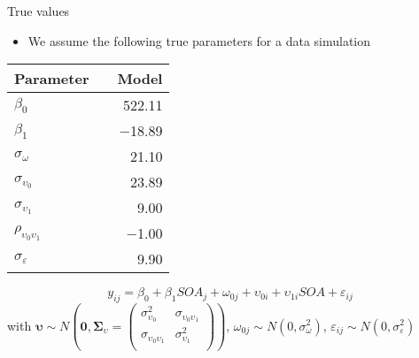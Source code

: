 \documentclass[aspectratio=169]{beamer}
\newcommand{\gvect}[1]{\boldsymbol{#1}}
\newcommand{\gmat}[1]{\boldsymbol{#1}}
\begin{document}
\begin{frame}{True values}
  \begin{itemize}
    \item We assume the following true parameters for a data simulation
  \end{itemize}
  \begin{center}
  \begin{tabular}{lrr}
    \hline
    Parameter && Model \\
    \hline
    $\beta_0$                     && 522.11\\
    $\beta_1$                     && $-$18.89\\
    $\sigma_{\omega}$             && 21.10\\
    $\sigma_{\upsilon_0}$         && 23.89\\
    $\sigma_{\upsilon_1}$         && 9.00\\
    $\rho_{\upsilon_0\upsilon_1}$ && $-$1.00\\
    $\sigma_{\varepsilon}$        && 9.90\\
    \hline
  \end{tabular}
  \end{center}
     \[
       y_{ij} = \beta_0 + \beta_1 SOA_j + \omega_{0j} + \upsilon_{0i} +
       \upsilon_{1i} SOA + \varepsilon_{ij} 
  \]
\small
with $\gvect{\upsilon} \sim N\left(\gvect{0}, \gmat{\Sigma}_{\upsilon} = 
    \begin{pmatrix}
      \sigma^2_{\upsilon_0} & \sigma_{\upsilon_0\upsilon_1} \\
      \sigma_{\upsilon_0\upsilon_1} & \sigma^2_{\upsilon_1} \\
    \end{pmatrix}\right)$,
  $\omega_{0j} \sim N(0, \sigma_{\omega}^2)$, $\varepsilon_{ij} \sim N(0,
  \sigma_{\varepsilon}^2)$ 
\end{frame}
\end{document}
